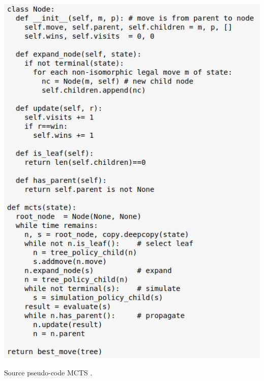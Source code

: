 \documentclass{article}
\begin{document}
\centerline{\includegraphics[scale = 0.5]{img/Monte_carlo_tree_search.png}}
\medskip
Source pseudo-code MCTS \cite{MCTS_pc}.
\newpage




\end{document}
